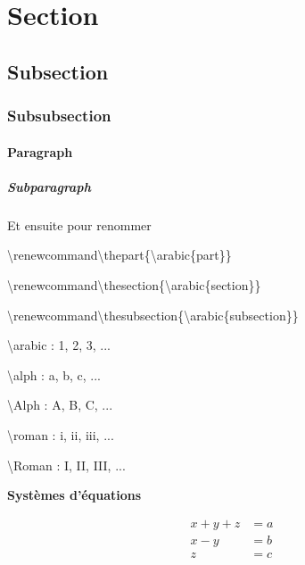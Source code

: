 \documentclass{report}
\begin{document}
\section{Section}

\subsection{Subsection}

\subsubsection{Subsubsection}

\paragraph{Paragraph}

\subparagraph{Subparagraph}

\paragraph{}

\paragraph{}

Et ensuite pour renommer

{\selectfont

\textbackslash{}renewcommand\textbackslash{}thepart\{\textbackslash{}arabic\{part\}\}

\textbackslash{}renewcommand\textbackslash{}thesection\{\textbackslash{}arabic\{section\}\}

\textbackslash{}renewcommand\textbackslash{}thesubsection\{\textbackslash{}arabic\{subsection\}\}

\textbackslash{}arabic : 1, 2, 3, ...

\textbackslash{}alph : a, b, c, ...

\textbackslash{}Alph : A, B, C, ...

\textbackslash{}roman : i, ii, iii, ...

\textbackslash{}Roman : I, II, III, ...

}





\newpage

\textbf{Systèmes d'équations}

\begin{align*}
x + y + z &= a\\
x - y &= b\\
z &= c
\end{align*}
\end{document}

